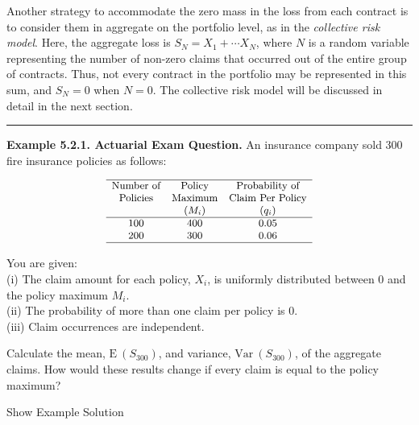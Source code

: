 \documentclass[]{book}
\theoremstyle{definition}
\theoremstyle{definition}
\theoremstyle{definition}
\theoremstyle{remark}
\begin{document}
Another strategy to accommodate the zero mass in the loss from each
contract is to consider them in aggregate on the portfolio level, as in
the \emph{collective risk model}. Here, the aggregate loss is
\(S_{N} = X_1 + \cdots X_N\), where \(N\) is a random variable
representing the number of non-zero claims that occurred out of the
entire group of contracts. Thus, not every contract in the portfolio may
be represented in this sum, and \(S_N=0\) when \(N=0\). The collective
risk model will be discussed in detail in the next section.

\begin{center}\rule{0.5\linewidth}{\linethickness}\end{center}

\textbf{Example 5.2.1. Actuarial Exam Question.} An insurance company
sold 300 fire insurance policies as follows:

\[
{\small 
\begin{matrix}
    \begin{array}{c c c} \hline
        \text{Number of} & \text{Policy} & \text{Probability of}\\
        \text{Policies} &  \text{Maximum} &  \text{Claim Per Policy}\\ 
        & (M_i) & (q_i) \\ \hline
        100 & 400 & 0.05\\
        200 & 300 & 0.06\\ \hline
    \end{array}
\end{matrix}
}
\]

You are given:\\
(i) The claim amount for each policy, \(X_i\), is uniformly distributed
between \(0\) and the policy maximum \(M_i\).\\
(ii) The probability of more than one claim per policy is \(0\).\\
(iii) Claim occurrences are independent.

Calculate the mean, \(\mathrm{E~}(S_{300})\), and variance,
\(\mathrm{Var~}(S_{300})\), of the aggregate claims. How would these
results change if every claim is equal to the policy maximum?

Show Example Solution
\end{document}

